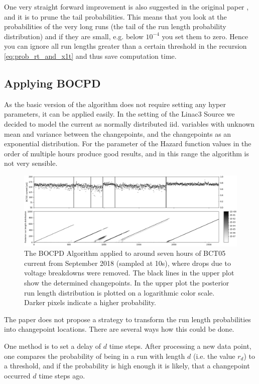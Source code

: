 \documentclass[12pt,a4paper]{article}
\begin{document}
One very straight forward improvement is also suggested in the original paper \cite{Adams:BayesianOnlineChangepoint}, and it is to prune the tail probabilities. This means that you look at the probabilities of the very long runs (the tail of the run length probability distribution) and if they are small, e.g. below $10^{-4}$ you set them to zero. Hence you can ignore all run lengths greater than a certain threshold in the recursion \eqref{eq:prob_rt_and_x1t} and thus save computation time.

\subsection{Applying BOCPD}
As the basic version of the algorithm does not require setting any hyper parameters, it can be applied easily. In the setting of the Linac3 Source we decided to model the current as normally distributed iid. variables with unknown mean and variance between the changepoints, and the changepoints as an exponential distribution. For the parameter of the Hazard function values in the order of multiple hours produce good results, and in this range the algorithm is not very sensible.

\begin{figure}
	\centering
	\includegraphics{images/bocd_example.png}
	\caption{The BOCPD Algorithm applied to around seven hours of BCT05 current from September 2018 (sampled at 10s), where drops due to voltage breakdowns were removed. The black lines in the upper plot show the determined changepoints. In the upper plot the posterior run length distribution is plotted on a logarithmic color scale. Darker pixels indicate a higher probability.}
	\label{fig:bocd_example}
\end{figure}

The paper \cite{Adams:BayesianOnlineChangepoint} does not propose a strategy to transform the run length probabilities into changepoint locations. There are several ways how this could be done.

One method is to set a delay of $d$ time steps. After processing a new data point, one compares the probability of being in a run with length $d$ (i.e. the value $r_d$) to a threshold, and if the probability is high enough it is likely, that a changepoint occurred $d$ time steps ago.
\end{document}
